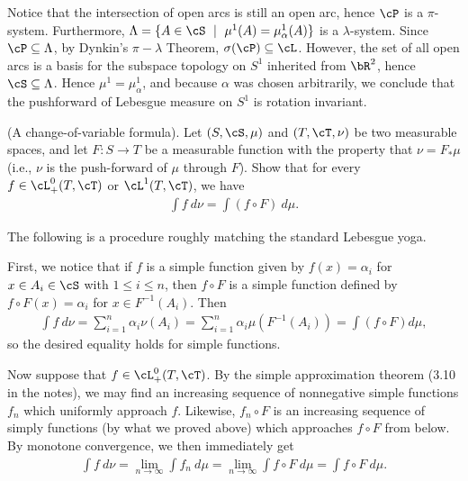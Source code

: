 \begin{homework}[e]
\begin{prf}
		Notice that the intersection of open arcs is still an open arc, hence $\cP$ is a $\pi$-system. Furthermore, $\Lambda = \{A\in \cS ~\mid~ \mu^1(A) = \mu^1_\alpha(A)\}$ is a $\lambda$-system. Since $\cP \subseteq \Lambda$, by Dynkin's $\pi-\lambda$ Theorem, $\sigma(\cP) \subseteq \cL$. However, the set of all open arcs is a basis for the subspace topology on $S^1$ inherited from $\bR^2$, hence $\cS \subseteq \Lambda$. Hence $\mu^1 = \mu^1_\alpha$, and because $\alpha$ was chosen arbitrarily, we conclude that the pushforward of Lebesgue measure on $S^1$ is rotation invariant.
	\end{prf}
	 (A change-of-variable formula). Let $(S,\cS,\mu)$ and $(T,\cT,\nu)$ be two measurable spaces, and let $F:S\to T$ be a measurable function with the property that $\nu = F_* \mu$ (i.e., $\nu$ is the push-forward of $\mu$ through $F$). Show that for every $f \in \cL^0_+(T,\cT)$ or $\cL^1(T,\cT)$, we have
	\begin{align*}
		\int f ~d\nu = \int (f\circ F) ~d\mu.
	\end{align*}
	\begin{prf}
		The following is a procedure roughly matching the standard Lebesgue yoga.

		First, we notice that if $f$ is a simple function given by $f(x) = \alpha_i$ for $x \in A_i \in \cS$ with $1\leq i\leq n$, then $f\circ F$ is a simple function defined by $f\circ F(x) = \alpha_i$ for $x \in F^{-1}(A_i)$. Then
		\begin{align*}
			\int f ~d\nu = \sum_{i=1}^n \alpha_i\nu(A_i) = \sum_{i=1}^n \alpha_i\mu(F^{-1}(A_i)) = \int (f\circ F) d\mu,
		\end{align*}
		so the desired equality holds for simple functions.

		Now suppose that $f \in \cL^0_+(T,\cT)$. By the simple approximation theorem (3.10 in the notes), we may find an increasing sequence of nonnegative simple functions $f_n$ which uniformly approach $f$. Likewise, $f_n \circ F$ is an increasing sequence of simply functions (by what we proved above) which approaches $f \circ F$ from below. By monotone convergence, we then immediately get
		\begin{align*}
			\int f ~d\nu = \lim_{n\to \infty} \int f_n ~d\mu = \lim_{n\to \infty} \int f\circ F ~d\mu = \int f\circ F ~d\mu.
		\end{align*}
		

\end{prf}
\end{homework}
